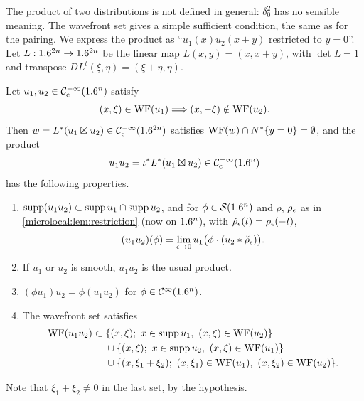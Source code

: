 The product of two distributions is not defined in general: $\delta_0^2$ has
no sensible meaning. The wavefront set gives a simple sufficient condition,
the same as for the pairing. We express the product as ``$u_1(x)u_2(x+y)$ restricted to $y=0$''. Let
$L:1.6^{2n}\to1.6^{2n}$ be the linear map $L(x,y)=(x,x+y)$, with $\det L=1$
and transpose $DL^t(\xi,\eta)=(\xi+\eta,\eta)$.

\begin{theorem}[Products]\label{microlocal:thm:products}
  Let $u_1,u_2\in\mathcal{C}^{-\infty}_{\mathrm{c}}(1.6^n)$ satisfy
  \begin{equation*}
    (x,\xi)\in\operatorname{WF}(u_1)\Longrightarrow(x,-\xi)\notin\operatorname{WF}(u_2).
  \end{equation*}
  Then $w=L^*(u_1\boxtimes u_2)\in\mathcal{C}^{-\infty}_{\mathrm{c}}(1.6^{2n})$ satisfies
  $\operatorname{WF}(w)\cap N^*\{y=0\}=\emptyset$, and the product
  \begin{equation*}
    u_1u_2=\iota^*L^*(u_1\boxtimes u_2)\in\mathcal{C}^{-\infty}_{\mathrm{c}}(1.6^n)
  \end{equation*}
  has the following properties.
  \begin{enumerate}[label=\textup{(\roman*)}]
  \item $\operatorname{supp}(u_1u_2)\subset\operatorname{supp} u_1\cap\operatorname{supp} u_2$, and for
    $\phi\in\mathcal{S}(1.6^n)$ and $\rho$, $\rho_\epsilon$ as in
    \cref{microlocal:lem:restriction} (now on $1.6^n$), with
    $\check\rho_\epsilon(t)=\rho_\epsilon(-t)$,
    \begin{equation*}
      (u_1u_2)(\phi)=\lim_{\epsilon\to0}u_1\bigl(\phi\cdot(u_2*\check\rho_\epsilon)\bigr).
    \end{equation*}
  \item If $u_1$ or $u_2$ is smooth, $u_1u_2$ is the usual product.
  \item $(\phi u_1)u_2=\phi(u_1u_2)$ for $\phi\in\mathcal{C}^\infty(1.6^n)$.
  \item The wavefront set satisfies
    \begin{align*}
      \WF(u_1u_2)\subset{}&\{(x,\xi);\ x\in\supp u_1,\ (x,\xi)\in\WF(u_2)\}\\
      &\cup\{(x,\xi);\ x\in\supp u_2,\ (x,\xi)\in\WF(u_1)\}\\
      &\cup\{(x,\xi_1+\xi_2);\ (x,\xi_1)\in\WF(u_1),\ (x,\xi_2)\in\WF(u_2)\}.
    \end{align*}
  \end{enumerate}
\end{theorem}
Note that $\xi_1+\xi_2\ne0$ in the last set, by the hypothesis.
